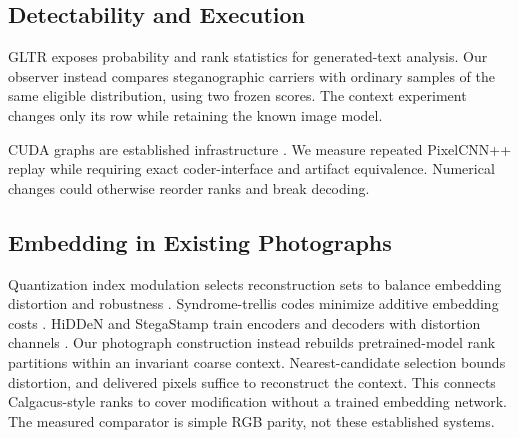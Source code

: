 \subsection{Detectability and Execution}
GLTR \cite{gltr} exposes probability and rank statistics for generated-text analysis. Our observer instead compares steganographic carriers with ordinary samples of the same eligible distribution, using two frozen scores. The context experiment changes only its row while retaining the known image model.

CUDA graphs are established infrastructure \cite{pytorchgraphs}. We measure repeated PixelCNN++ replay while requiring exact coder-interface and artifact equivalence. Numerical changes could otherwise reorder ranks and break decoding.

\subsection{Embedding in Existing Photographs}
Quantization index modulation selects reconstruction sets to balance embedding distortion and robustness \cite{qim}. Syndrome-trellis codes minimize additive embedding costs \cite{stc}. HiDDeN and StegaStamp train encoders and decoders with distortion channels \cite{hidden,stegastamp}. Our photograph construction instead rebuilds pretrained-model rank partitions within an invariant coarse context. Nearest-candidate selection bounds distortion, and delivered pixels suffice to reconstruct the context. This connects Calgacus-style ranks to cover modification without a trained embedding network. The measured comparator is simple RGB parity, not these established systems.

